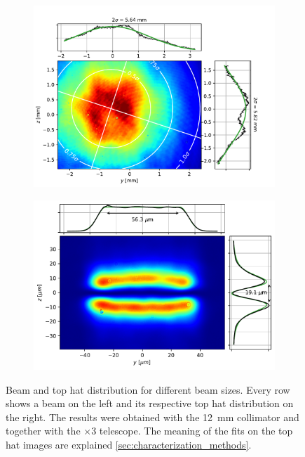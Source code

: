 \begin{figure}
\begin{subfigure}{0.5\textwidth}
        \includegraphics[height=0.75\textwidth]{chapters/chapter_3/figures/x3_sizes/beam2.pdf}
        \caption{}
        \label{fig:f12x3_large_beam}
    \end{subfigure}
    \begin{subfigure}{0.5\textwidth}
        \centering
        \includegraphics[height=0.7\textwidth]{chapters/chapter_3/figures/x3_sizes/tophat2.pdf}
        \caption{}
        \label{fig:f12x3_large_tophat}
    \end{subfigure}
    \caption{Beam and top hat distribution for different beam sizes. Every row shows a beam on the left and its respective top hat distribution on the right. The results were obtained
        with the \SI{12}{mm} collimator and together with the $\times3$ telescope. The meaning of the fits on the top hat images are explained \cref{sec:characterization_methods}.}
    \label{fig:f12x3_sizes}
\end{figure}

